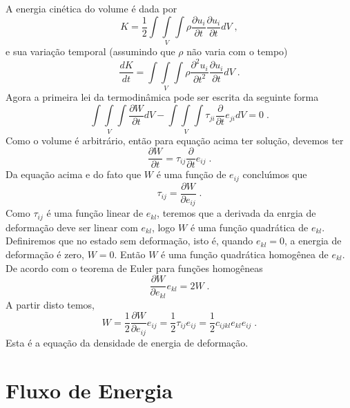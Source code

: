 A energia cin\'etica do volume \'e dada por
\begin{equation}
K=\frac{1}{2}\int \! \!\int\limits_{V} \! \!\int \rho\frac{\partial u_{i}}{\partial t}
\frac{\partial u_{i}}{\partial t}dV \;,
\end{equation}
e sua varia\c{c}\~ao temporal (assumindo que $\rho$ n\~ao varia com o tempo)
\begin{equation}
\frac{dK}{dt}=\int \! \!\int\limits_{V} \! \!\int \rho\frac{\partial^{2} u_{i}}{\partial t^{2}}
\frac{\partial u_{i}}{\partial t}dV \;.
\end{equation}
Agora a primeira lei da termodin\^amica pode ser escrita da seguinte forma
\begin{equation}
\int \! \!\int\limits_{V} \! \!\int \frac{\partial W}{\partial t} dV-
\int \! \!\int\limits_{V} \! \!\int
\tau_{ji}\frac{\partial}{\partial t}e_{ji}dV=0 \;.
\end{equation}
Como o volume \'e arbitr\'ario, ent\~ao para equa\c{c}\~ao acima ter solu\c{c}\~ao, devemos ter
\begin{equation}
\frac{\partial W}{\partial t} =\tau_{ij}\frac{\partial}{\partial t}e_{ij} \;.
\end{equation}
Da equa\c{c}\~ao acima e do fato que $W$ \'e uma fun\c{c}\~ao de $e_{ij}$ conclu\'\i mos que
\begin{equation}
\tau_{ij}=\frac{\partial W}{\partial e_{ij}} \;.
\end{equation}
Como $\tau_{ij}$ \'e uma fun\c{c}\~ao linear de $e_{kl}$,
teremos que a derivada da enrgia de deforma\c{c}\~ao
deve ser linear com $e_{kl}$, logo $W$ \'e uma fun\c{c}\~ao
quadr\'atica de $e_{kl}$. Definiremos
que no estado sem deforma\c{c}\~ao, isto \'e, quando
$e_{kl}=0$, a energia de deforma\c{c}\~ao \'e zero, $W=0$. Ent\~ao
$W$ \'e uma fun\c{c}\~ao quadr\'atica homog\^enea de $e_{kl}$. De acordo com o teorema de Euler
para fun\c{c}\~oes homog\^eneas
\begin{equation}
\frac{\partial W}{\partial e_{kl}}e_{kl}=2W \;.
\end{equation}
A partir disto temos,
\begin{equation}
W=\frac{1}{2}\frac{\partial W}{\partial e_{ij}}e_{ij}=\frac{1}{2}\tau_{ij}e_{ij}=
\frac{1}{2}c_{ijkl}e_{kl}e_{ij} \;.
\end{equation}
Esta \'e a equa\c{c}\~ao da densidade de energia de deforma\c{c}\~ao.

\section{Fluxo de Energia}

